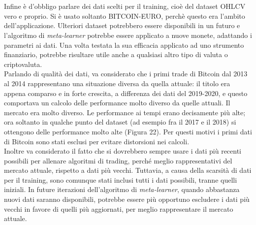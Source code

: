 \documentclass[a4paper,12pt]{report}
\begin{document}
\begin{fig}
\\~\\Infine è d'obbligo parlare dei dati scelti per il training, cioè del dataset OHLCV vero e proprio. Si è usato soltanto BITCOIN-EURO, perchè questo era l'ambito dell'applicazione. Ulteriori dataset potrebbero essere disponibili in un futuro e l'algoritmo di \textit{meta-learner} potrebbe essere applicato a nuove monete, adattando i parametri ai dati. Una volta testata la sua efficacia applicato ad uno strumento finanziario, potrebbe risultare utile anche a qualsiasi altro tipo di valuta o criptovaluta.\\ Parlando di qualità dei dati, va considerato che i primi trade di Bitcoin dal 2013 al 2014 rappresentano una situazione diversa da quella attuale: il titolo era appena comparso e in forte crescita, a differenza dei dati del 2019-2020, e questo comportava un calcolo delle performance molto diverso da quelle attuali. Il mercato era molto diverso. Le performance ai tempi erano decisamente più alte; ora soltanto in qualche punto del dataset (ad esempio fra il 2017 e il 2018) si ottengono delle performance molto alte (Figura 22). Per questi motivi i primi dati di Bitcoin sono stati esclusi per evitare distorsioni nei calcoli.\\ Inoltre va considerato il fatto che si dovrebbero sempre usare i dati più recenti possibili per allenare algoritmi di trading, perché meglio rappresentativi del mercato attuale, rispetto a dati più vecchi. Tuttavia, a causa della scarsità di dati per il training, sono comunque stati inclusi tutti i dati possibili, tranne quelli iniziali. In future iterazioni dell'algoritmo di \textit{meta-learner}, quando abbastanza nuovi dati saranno disponibili, potrebbe essere più opportuno escludere i dati più vecchi in favore di quelli più aggiornati, per meglio rappresentare il mercato attuale.

\end{fig}
\end{document}
